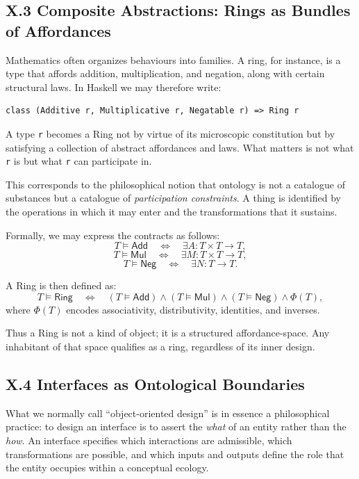 \documentclass[11pt,letterpaper]{article}
\begin{document}
\subsection{X.3 Composite Abstractions: Rings as Bundles of Affordances}

Mathematics often organizes behaviours into families. A ring, for instance, is a type that affords addition, multiplication, and negation, along with certain structural laws. In Haskell we may therefore write:

\begin{verbatim}
class (Additive r, Multiplicative r, Negatable r) => Ring r
\end{verbatim}

A type \texttt{r} becomes a Ring not by virtue of its microscopic constitution but by satisfying a collection of abstract affordances and laws. What matters is not what \texttt{r} is but what \texttt{r} can participate in.

This corresponds to the philosophical notion that ontology is not a catalogue of substances but a catalogue of \emph{participation constraints}. A thing is identified by the operations in which it may enter and the transformations that it sustains.

Formally, we may express the contracts as follows:
\[
T \vDash \mathsf{Add} \quad \iff \quad \exists A : T \times T \to T,
\]
\[
T \vDash \mathsf{Mul} \quad \iff \quad \exists M : T \times T \to T,
\]
\[
T \vDash \mathsf{Neg} \quad \iff \quad \exists N : T \to T.
\]

A Ring is then defined as:
\[
T \vDash \mathsf{Ring} \quad \iff \quad 
(T \vDash \mathsf{Add}) \land 
(T \vDash \mathsf{Mul}) \land
(T \vDash \mathsf{Neg}) \land \Phi(T),
\]
where \(\Phi(T)\) encodes associativity, distributivity, identities, and inverses.

Thus a Ring is not a kind of object; it is a structured affordance-space. Any inhabitant of that space qualifies as a ring, regardless of its inner design.

\subsection{X.4 Interfaces as Ontological Boundaries}

What we normally call ``object-oriented design'' is in essence a philosophical practice: to design an interface is to assert the \emph{what} of an entity rather than the \emph{how}. An interface specifies which interactions are admissible, which transformations are possible, and which inputs and outputs define the role that the entity occupies within a conceptual ecology.
\end{document}
